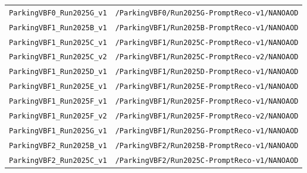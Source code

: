 \begin{longtable}{@{}>{\RaggedRight\arraybackslash}p{} >{\RaggedRight\arraybackslash}p{}@{}}
\addlinespace[2pt]
\texttt{ParkingVBF0\_\allowbreak{}Run2025G\_\allowbreak{}v1} & \texttt{/\allowbreak{}ParkingVBF0/\allowbreak{}Run2025G-\allowbreak{}PromptReco-\allowbreak{}v1/\allowbreak{}NANOAOD} \\
\addlinespace[2pt]
\texttt{ParkingVBF1\_\allowbreak{}Run2025B\_\allowbreak{}v1} & \texttt{/\allowbreak{}ParkingVBF1/\allowbreak{}Run2025B-\allowbreak{}PromptReco-\allowbreak{}v1/\allowbreak{}NANOAOD} \\
\addlinespace[2pt]
\texttt{ParkingVBF1\_\allowbreak{}Run2025C\_\allowbreak{}v1} & \texttt{/\allowbreak{}ParkingVBF1/\allowbreak{}Run2025C-\allowbreak{}PromptReco-\allowbreak{}v1/\allowbreak{}NANOAOD} \\
\addlinespace[2pt]
\texttt{ParkingVBF1\_\allowbreak{}Run2025C\_\allowbreak{}v2} & \texttt{/\allowbreak{}ParkingVBF1/\allowbreak{}Run2025C-\allowbreak{}PromptReco-\allowbreak{}v2/\allowbreak{}NANOAOD} \\
\addlinespace[2pt]
\texttt{ParkingVBF1\_\allowbreak{}Run2025D\_\allowbreak{}v1} & \texttt{/\allowbreak{}ParkingVBF1/\allowbreak{}Run2025D-\allowbreak{}PromptReco-\allowbreak{}v1/\allowbreak{}NANOAOD} \\
\addlinespace[2pt]
\texttt{ParkingVBF1\_\allowbreak{}Run2025E\_\allowbreak{}v1} & \texttt{/\allowbreak{}ParkingVBF1/\allowbreak{}Run2025E-\allowbreak{}PromptReco-\allowbreak{}v1/\allowbreak{}NANOAOD} \\
\addlinespace[2pt]
\texttt{ParkingVBF1\_\allowbreak{}Run2025F\_\allowbreak{}v1} & \texttt{/\allowbreak{}ParkingVBF1/\allowbreak{}Run2025F-\allowbreak{}PromptReco-\allowbreak{}v1/\allowbreak{}NANOAOD} \\
\addlinespace[2pt]
\texttt{ParkingVBF1\_\allowbreak{}Run2025F\_\allowbreak{}v2} & \texttt{/\allowbreak{}ParkingVBF1/\allowbreak{}Run2025F-\allowbreak{}PromptReco-\allowbreak{}v2/\allowbreak{}NANOAOD} \\
\addlinespace[2pt]
\texttt{ParkingVBF1\_\allowbreak{}Run2025G\_\allowbreak{}v1} & \texttt{/\allowbreak{}ParkingVBF1/\allowbreak{}Run2025G-\allowbreak{}PromptReco-\allowbreak{}v1/\allowbreak{}NANOAOD} \\
\addlinespace[2pt]
\texttt{ParkingVBF2\_\allowbreak{}Run2025B\_\allowbreak{}v1} & \texttt{/\allowbreak{}ParkingVBF2/\allowbreak{}Run2025B-\allowbreak{}PromptReco-\allowbreak{}v1/\allowbreak{}NANOAOD} \\
\addlinespace[2pt]
\texttt{ParkingVBF2\_\allowbreak{}Run2025C\_\allowbreak{}v1} & \texttt{/\allowbreak{}ParkingVBF2/\allowbreak{}Run2025C-\allowbreak{}PromptReco-\allowbreak{}v1/\allowbreak{}NANOAOD} \\

\end{longtable}
